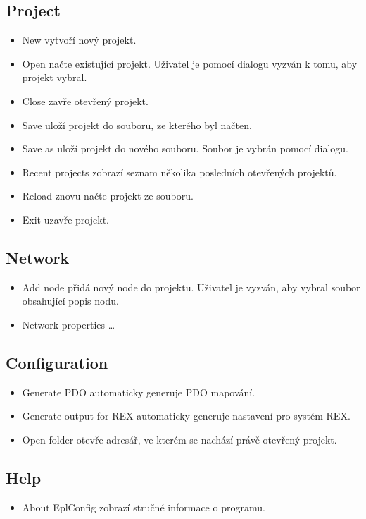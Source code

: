 \subsection{Project}
\begin{itemize}
\item New vytvoří nový projekt.
\item Open načte existující projekt. Uživatel je pomocí dialogu vyzván k tomu, aby projekt vybral. 
\item Close zavře otevřený projekt.
\item Save uloží projekt do souboru, ze kterého byl načten.
\item Save as uloží projekt do nového souboru. Soubor je vybrán pomocí dialogu.
\item Recent projects zobrazí seznam několika posledních otevřených projektů.
\item Reload znovu načte projekt ze souboru.
\item Exit uzavře projekt. 
\end{itemize}

\subsection{Network}
\begin{itemize}
\item Add node přidá nový node do projektu. Uživatel je vyzván, aby vybral soubor obsahující popis nodu.
\item Network properties \ldots
\end{itemize}

\subsection{Configuration}
\begin{itemize}
\item Generate PDO automaticky generuje PDO mapování.
\item Generate output for REX automaticky generuje nastavení pro systém REX.
\item Open folder otevře adresář, ve kterém se nachází právě otevřený projekt.
\end{itemize}

\subsection{Help}
\begin{itemize}
\item About EplConfig zobrazí stručné informace o programu.
\end{itemize}

